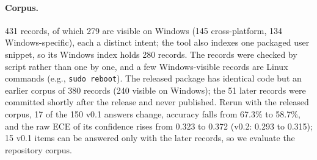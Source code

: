 \paragraph{Corpus.} 431 records, of which 279 are visible on Windows (145 cross-platform, 134
Windows-specific), each a distinct intent; the tool also indexes one packaged user snippet, so its Windows index
holds 280 records. The records were checked by script rather than one by one, and a few Windows-visible records
are Linux commands (e.g., \texttt{sudo reboot}). The released package has identical code but an earlier corpus of
380 records (240 visible on Windows); the 51 later records were committed shortly after the release and never
published. Rerun with the released corpus, 17 of the 150 v0.1 answers change, accuracy falls from 67.3\% to
58.7\%, and the raw ECE of its confidence rises from 0.323 to 0.372 (v0.2: 0.293 to 0.315); 15 v0.1 items can be
answered only with the later records, so we evaluate the repository corpus.

